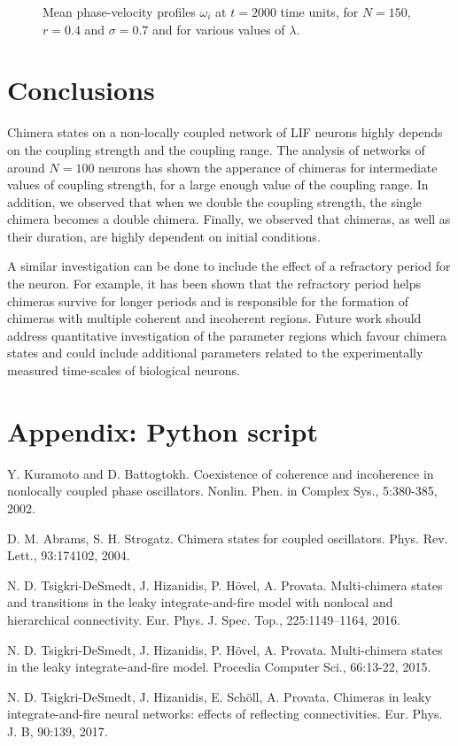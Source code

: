 \documentclass[a4paper,12pt]{article}
\begin{document}
\begin{figure}[H]
\caption{Mean phase-velocity profiles $\omega_i$ at $t=2000$ time units, for $N=150$, $r=0.4$ and $\sigma = 0.7$ and for various values of $\lambda$.}
\label{uivslmd2}
\end{figure}

\section{Conclusions}
Chimera states on a non-locally coupled network of LIF neurons highly depends on the coupling strength and the coupling range. The analysis of networks of around $N=100$ neurons has shown the apperance of chimeras for intermediate values of coupling strength, for a large enough value of the coupling range. In addition, we observed that when we double the coupling strength, the single chimera becomes a double chimera. Finally, we observed that chimeras, as well as their duration, are highly dependent on initial conditions.
\par A similar investigation can be done to include the effect of a refractory period for the neuron. For example, it has been shown \cite{tsigkrimulti} that the refractory period helps chimeras survive for longer periods and is responsible for the formation of chimeras with multiple coherent and incoherent regions. Future work should address quantitative investigation of the parameter regions which favour chimera states and could include additional parameters related to the experimentally measured time-scales of biological neurons.

\section{Appendix: Python script}





\pagebreak

\begin{thebibliography}{30}

Y. Kuramoto and D. Battogtokh. Coexistence of coherence and incoherence in nonlocally coupled phase oscillators. Nonlin. Phen. in Complex Sys., 5:380-385, 2002.

D. M. Abrams, S. H. Strogatz. Chimera states for coupled oscillators. Phys. Rev. Lett., 93:174102, 2004.

N. D. Tsigkri-DeSmedt, J. Hizanidis, P. H{\"o}vel, A. Provata. Multi-chimera states and transitions in the leaky integrate-and-fire model with nonlocal and hierarchical connectivity. Eur. Phys. J. Spec. Top., 225:1149–1164, 2016.

N. D. Tsigkri-DeSmedt, J. Hizanidis, P. H{\"o}vel, A. Provata. Multi-chimera states in the leaky integrate-and-fire model. Procedia Computer Sci., 66:13-22, 2015.

N. D. Tsigkri-DeSmedt, J. Hizanidis, E. Sch{\"o}ll, A. Provata. Chimeras in leaky integrate-and-fire neural networks: effects of reflecting connectivities. Eur. Phys. J. B, 90:139, 2017.

\end{thebibliography}
\end{document}

